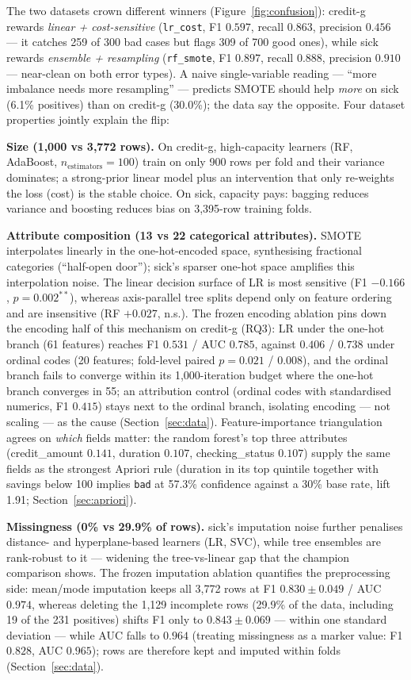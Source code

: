 The two datasets crown different winners (Figure~\ref{fig:confusion}): credit-g rewards \emph{linear + cost-sensitive} (\texttt{lr\_cost}, F1 $0.597$, recall $0.863$, precision $0.456$ --- it catches 259 of 300 bad cases but flags 309 of 700 good ones), while sick rewards \emph{ensemble + resampling} (\texttt{rf\_smote}, F1 $0.897$, recall $0.888$, precision $0.910$ --- near-clean on both error types). A naive single-variable reading --- ``more imbalance needs more resampling'' --- predicts SMOTE should help \emph{more} on sick (6.1\% positives) than on credit-g (30.0\%); the data say the opposite. Four dataset properties jointly explain the flip:

\textbf{Size (1{,}000 vs 3{,}772 rows).} On credit-g, high-capacity learners (RF, AdaBoost, $n_{\mathrm{estimators}}=100$) train on only 900 rows per fold and their variance dominates; a strong-prior linear model plus an intervention that only re-weights the loss (cost) is the stable choice. On sick, capacity pays: bagging reduces variance and boosting reduces bias on 3{,}395-row training folds.

\textbf{Attribute composition (13 vs 22 categorical attributes).} SMOTE interpolates linearly in the one-hot-encoded space, synthesising fractional categories (``half-open door''); sick's sparser one-hot space amplifies this interpolation noise. The linear decision surface of LR is most sensitive (F1 $-0.166$, $p=0.002^{**}$), whereas axis-parallel tree splits depend only on feature ordering and are insensitive (RF $+0.027$, n.s.). The frozen encoding ablation pins down the encoding half of this mechanism on credit-g (RQ3): LR under the one-hot branch (61 features) reaches F1 $0.531$ / AUC $0.785$, against $0.406$ / $0.738$ under ordinal codes (20 features; fold-level paired $p=0.021$ / $0.008$), and the ordinal branch fails to converge within its 1{,}000-iteration budget where the one-hot branch converges in 55; an attribution control (ordinal codes with standardised numerics, F1 $0.415$) stays next to the ordinal branch, isolating encoding --- not scaling --- as the cause (Section~\ref{sec:data}). Feature-importance triangulation agrees on \emph{which} fields matter: the random forest's top three attributes (credit\_amount $0.141$, duration $0.107$, checking\_status $0.107$) supply the same fields as the strongest Apriori rule (duration in its top quintile together with savings below 100 implies \texttt{bad} at 57.3\% confidence against a 30\% base rate, lift 1.91; Section~\ref{sec:apriori}).

\textbf{Missingness (0\% vs 29.9\% of rows).} sick's imputation noise further penalises distance- and hyperplane-based learners (LR, SVC), while tree ensembles are rank-robust to it --- widening the tree-vs-linear gap that the champion comparison shows. The frozen imputation ablation quantifies the preprocessing side: mean/mode imputation keeps all 3{,}772 rows at F1 $0.830\pm0.049$ / AUC $0.974$, whereas deleting the 1{,}129 incomplete rows (29.9\% of the data, including 19 of the 231 positives) shifts F1 only to $0.843\pm0.069$ --- within one standard deviation --- while AUC falls to $0.964$ (treating missingness as a marker value: F1 $0.828$, AUC $0.965$); rows are therefore kept and imputed within folds (Section~\ref{sec:data}).

